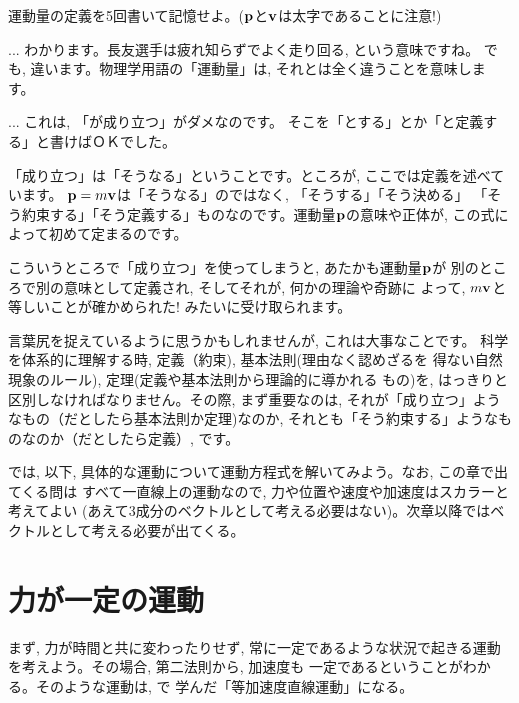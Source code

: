 \begin{q}\label{q:def_momentum}
運動量の定義を5回書いて記憶せよ。(${\bf p}$と${\bf v}$は太字であることに注意!)
\end{q}
\mv

\begin{faq}{\small{} ... わかります。長友選手は疲れ知らずでよく走り回る, という意味ですね。
でも, 違います。物理学用語の「運動量」は, それとは全く違うことを意味します。}\end{faq}

\begin{faq}{\small{} ... これは, 「が成り立つ」がダメなのです。
そこを「とする」とか「と定義する」と書けばＯＫでした。

「成り立つ」は「そうなる」ということです。ところが, ここでは定義を述べています。
${\bf p}=m{\bf v}$は「そうなる」のではなく, 「そうする」「そう決める」
「そう約束する」「そう定義する」ものなのです。運動量${\bf p}$の意味や正体が, 
この式によって初めて定まるのです。

こういうところで「成り立つ」を使ってしまうと, あたかも運動量${\bf p}$が
別のところで別の意味として定義され, そしてそれが, 何かの理論や奇跡に
よって, $m{\bf v}$と等しいことが確かめられた! みたいに受け取られます。

言葉尻を捉えているように思うかもしれませんが, これは大事なことです。
科学を体系的に理解する時, 定義（約束), 基本法則(理由なく認めざるを
得ない自然現象のルール), 定理(定義や基本法則から理論的に導かれる
もの)を, はっきりと区別しなければなりません。その際, まず重要なのは, 
それが「成り立つ」ようなもの（だとしたら基本法則か定理)なのか, 
それとも「そう約束する」ようなものなのか（だとしたら定義）, です。}\end{faq}
\mv

では, 以下, 具体的な運動について運動方程式を解いてみよう。なお, この章で出てくる問は
すべて一直線上の運動なので, 力や位置や速度や加速度はスカラーと考えてよい
(あえて3成分のベクトルとして考える必要はない)。次章以降ではベクトルとして考える必要が出てくる。
\hv


\section{力が一定の運動}

まず, 力が時間と共に変わったりせず, 常に一定であるような状況で起きる運動
を考えよう。その場合, 第二法則から, 加速度も
一定であるということがわかる。そのような運動は, で
学んだ「等加速度直線運動」になる。

